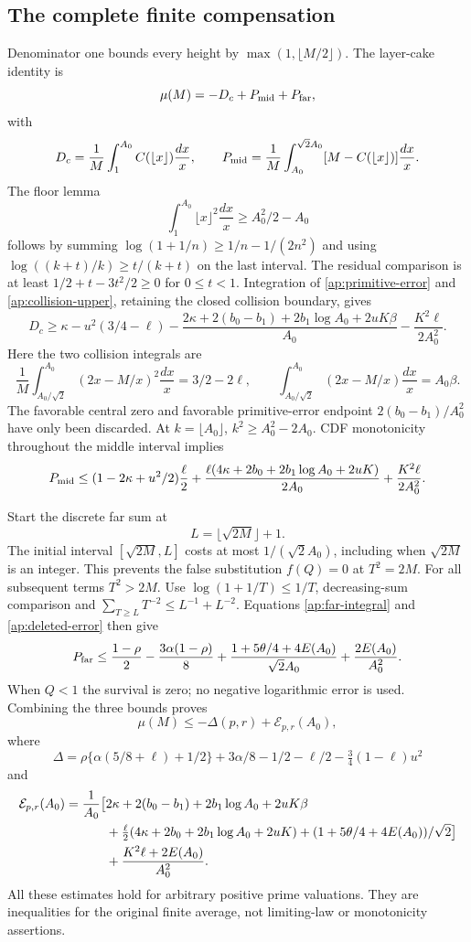 \documentclass[11pt]{article}
\theoremstyle{definition}\newtheorem{definition}[theorem]{Definition}
\theoremstyle{remark}\newtheorem{remark}[theorem]{Remark}
\begin{document}
\subsection{The complete finite compensation}
\label{ap:finite-balance}
Denominator one bounds every height by \(\max(1,\lfloor M/2\rfloor)\).
The layer-cake identity is
\[
 \mu(M)=-D_c+P_{\rm mid}+P_{\rm far},
\]
with
\[
 D_c=\frac1M\int_1^{A_0}C(\lfloor x\rfloor)\frac{dx}{x},\qquad
 P_{\rm mid}=\frac1M\int_{A_0}^{\sqrt2A_0}
                  [M-C(\lfloor x\rfloor)]\frac{dx}{x}.
\]
The floor lemma
\[
 \int_1^{A_0}\lfloor x\rfloor^2\frac{dx}{x}\geq A_0^2/2-A_0
\]
follows by summing
\(\log(1+1/n)\geq1/n-1/(2n^2)\) and using
\(\log((k+t)/k)\geq t/(k+t)\) on the last interval.
The residual comparison is at least \(1/2+t-3t^2/2\geq0\) for \(0\leq t<1\).
Integration of \eqref{ap:primitive-error} and
\eqref{ap:collision-upper}, retaining the closed collision boundary, gives
\[
 D_c\geq\kappa-u^2(3/4-\ell)
 -\frac{2\kappa+2(b_0-b_1)+2b_1\log A_0+2uK\beta}{A_0}
 -\frac{K^2\ell}{2A_0^2}.
\]
Here the two collision integrals are
\[
 \frac1M\int_{A_0/\sqrt2}^{A_0}
       (2x-M/x)^2\frac{dx}{x}=3/2-2\ell,\qquad
 \int_{A_0/\sqrt2}^{A_0}(2x-M/x)\frac{dx}{x}=A_0\beta.
\]
The favorable central zero and favorable primitive-error endpoint
\(2(b_0-b_1)/A_0^2\) have only been discarded.
At \(k=\lfloor A_0\rfloor\), \(k^2\geq A_0^2-2A_0\).
CDF monotonicity throughout the middle interval implies
\[
 P_{\rm mid}\leq(1-2\kappa+u^2/2)\frac\ell2
 +\frac{\ell(4\kappa+2b_0+2b_1\log A_0+2uK)}{2A_0}
 +\frac{K^2\ell}{2A_0^2}.
\]

Start the discrete far sum at
\[
 L=\lfloor\sqrt{2M}\rfloor+1 .
\]
The initial interval \([\sqrt{2M},L]\) costs at most
\(1/(\sqrt2 A_0)\), including when \(\sqrt{2M}\) is an integer.
This prevents the false substitution \(f(Q)=0\) at \(T^2=2M\).
For all subsequent terms \(T^2>2M\).
Use \(\log(1+1/T)\leq1/T\), decreasing-sum comparison and
\(\sum_{T\geq L}T^{-2}\leq L^{-1}+L^{-2}\).
Equations \eqref{ap:far-integral} and \eqref{ap:deleted-error} then give
\[
 P_{\rm far}\leq
 \frac{1-\rho}{2}-\frac{3\alpha(1-\rho)}8
 +\frac{1+5\theta/4+4E(A_0)}{\sqrt2 A_0}
 +\frac{2E(A_0)}{A_0^2}.
\]
When \(Q<1\) the survival is zero; no negative logarithmic error is used.
Combining the three bounds proves
\begin{equation}
 \mu(M)\leq-\Delta(p,r)+\mathcal E_{p,r}(A_0),
 \label{ap:master-balance}
\end{equation}
where
\[
 \Delta=
 \rho\{\alpha(5/8+\ell)+1/2\}
 +3\alpha/8-1/2-\ell/2-\tfrac34(1-\ell)u^2
\]
and
\begin{align}
 \mathcal E_{p,r}(A_0)
 =\frac1{A_0}\bigl[&
 2\kappa+2(b_0-b_1)+2b_1\log A_0+2uK\beta \notag\\
 &+\tfrac\ell2(4\kappa+2b_0+2b_1\log A_0+2uK)
 +(1+5\theta/4+4E(A_0))/\sqrt2\bigr] \notag\\
 &+\frac{K^2\ell+2E(A_0)}{A_0^2}.
 \label{ap:master-error}
\end{align}
All these estimates hold for arbitrary positive prime valuations.
They are inequalities for the original finite average, not limiting-law
or monotonicity assertions.
\end{document}
